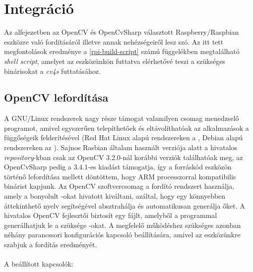 \section{Integráció}

Az alfejezetben az OpenCV és OpenCvSharp választott Raspberry/Raspbian eszközre való fordításáról illetve annak nehézségeiről lesz szó. Az itt tett megfontolások eredménye a \ref{rpi-build-script} számú függelékben megtalálható \emph{shell script}, amelyet az eszközünkön futtatva elérhetővé teszi a szükséges binárisokat a \emph{cv4s} futtatásához.

\subsection{OpenCV lefordítása}

A GNU/Linux rendszerek nagy része támogat valamilyen csomag menedzselő programot, amivel egyszerűen telepíthetőek és eltávolíthatóak az alkalmazások a függőségeik felderítésével (Red Hat Linux alapú rendszereken a , Debian alapú rendszereken az ). Sajnos  Rasbian általam használt verziója alatt a hivatalos \emph{repository}-kban csak az OpenCV 3.2.0-nál korábbi verziók találhatóak meg, az OpenCvSharp pedig a 3.4.1-es kiadást támogatja, így a forráskód eszközön történő lefordítása mellett döntöttem, hogy ARM processzorral kompatibilis binárist kapjunk. Az OpenCV szoftvercsomag a  fordító rendszert használja, amely a bonyolult -okat hivatott kiváltani, azáltal, hogy egy könnyebben áttekinthető nyelv segítségével absztrahálja és automatikusan generálja őket.
A hivatalos OpenCV fejlesztői  biztosít egy  fájlt, amelyből a  programmal generálhatjuk le a szüksége -okat.\cite{opencv} A megfelelő működéshez szükséges azonban néhány parancssori konfigurációs kapcsoló beállítására, amivel az eszközünkre szabjuk a fordítás eredményét.\\
\\
A beállított kapcsolók:
